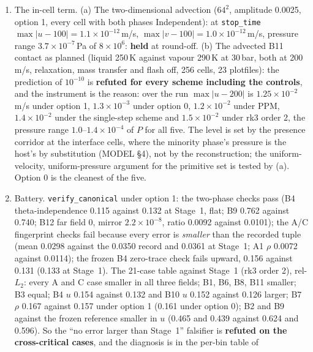 \documentclass[11pt,a4paper]{article}
\newcommand{\code}[1]{\texttt{\small #1}}
\begin{document}
\begin{enumerate}[nosep]
      masses, momentum and total energy to $1.5\times10^{-15}$:
      \textbf{held}.
\item The in-cell term.  (a) The two-dimensional advection ($64^2$,
      amplitude 0.0025, option 1, every cell with both phases
      Independent): at \code{stop\_time} $\max|u-100| = 1.1\times10^{-12}$\,m/s,
      $\max|v-100| = 1.0\times10^{-12}$\,m/s, pressure range
      $3.7\times10^{-7}$\,Pa of $8\times10^{6}$: \textbf{held} at
      round-off.  (b) The advected B11 contact as planned (liquid 250\,K
      against vapour 290\,K at 30\,bar, both at 200\,m/s, relaxation,
      mass transfer and flash off, 256 cells, 23 plotfiles): the
      prediction of $10^{-10}$ is \textbf{refuted for every scheme
      including the controls}, and the instrument is the reason: over the
      run $\max|u-200|$ is $1.25\times10^{-2}$\,m/s under option 1,
      $1.3\times10^{-3}$ under option 0, $1.2\times10^{-2}$ under PPM,
      $1.4\times10^{-2}$ under the single-step scheme and
      $1.5\times10^{-2}$ under rk3 order 2, the pressure range
      $1.0$--$1.4\times10^{-4}$ of $P$ for all five.  The level is set by
      the presence corridor at the interface cells, where the minority
      phase's pressure is the host's by substitution (MODEL \S4), not by
      the reconstruction; the uniform-velocity, uniform-pressure argument
      for the primitive set is tested by (a).  Option 0 is the cleanest of
      the five.
\item Battery.  \code{verify\_canonical} under option 1: the two-phase
      checks pass (B4 theta-independence 0.115 against 0.132 at Stage~1,
      flat; B9 0.762 against 0.740; B12 far field $0$, mirror
      $2.2\times10^{-8}$, ratio 0.0092 against 0.0101); the A/C
      fingerprint checks fail because every error is \emph{smaller} than
      the recorded tuple (mean 0.0298 against the 0.0350 record and
      0.0361 at Stage~1; A1 $\rho$ 0.0072 against 0.0114); the frozen B4
      zero-trace check fails upward, 0.156 against 0.131 (0.133 at
      Stage~1).  The 21-case table against Stage~1 (rk3 order 2), rel-$L_2$:
      every A and C case smaller in all three fields; B1, B6, B8, B11
      smaller; B3 equal; B4 $u$ 0.154 against 0.132 and B10 $u$ 0.152
      against 0.126 larger; B7 $\rho$ 0.167 against 0.157 under option 1
      (0.161 under option 0); B2 and B9 against the frozen reference
      smaller in $u$ (0.465 and 0.439 against 0.624 and 0.596).  So the
      ``no error larger than Stage~1'' falsifier is \textbf{refuted on the
      cross-critical cases}, and the diagnosis is in the per-bin table of

\end{enumerate}
\end{document}
